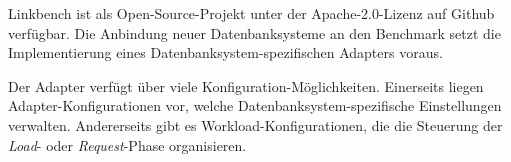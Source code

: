 Linkbench ist als Open-Source-Projekt unter der Apache-2.0-Lizenz auf Github verfügbar. Die Anbindung neuer Datenbanksysteme an den Benchmark setzt die Implementierung eines Datenbanksystem-spezifischen Adapters voraus. 

Der Adapter verfügt über viele Konfiguration-Möglichkeiten. Einerseits liegen Adapter-Konfigurationen vor, welche Datenbanksystem-spezifische Einstellungen verwalten. Andererseits gibt es Workload-Konfigurationen, die die Steuerung der \textit{Load}- oder \textit{Request}-Phase organisieren. 